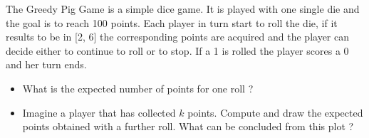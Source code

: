 \begin{question}
\label{ex:greedy_pig}
The Greedy Pig Game is a simple dice game. It is played with one single die and the goal is to reach 100 points. Each player in turn start to roll the die, if it results to be in [2, 6] the corresponding points are acquired and the player can decide either to continue to roll or to stop. If a 1 is rolled the player scores a 0 and her turn ends.

\begin{itemize}
\item What is the expected number of points for one roll ?
\item Imagine a player that has collected $k$ points. Compute and draw the expected points obtained with a further roll. What can be concluded from this plot ?
\end{itemize}
\end{question}

